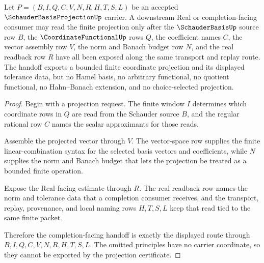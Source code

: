 \begin{theorem}
\label{thm:schauder-basis-projection-real-completion-handoff}
Let $P=(B,I,Q,C,V,N,R,H,T,S,L)$ be an accepted $\SchauderBasisProjectionUp$ carrier. A downstream Real or completion-facing consumer may read the finite projection only after the $\SchauderBasisUp$ source row $B$, the $\CoordinateFunctionalUp$ rows $Q$, the coefficient names $C$, the vector assembly row $V$, the norm and Banach budget row $N$, and the real readback row $R$ have all been exposed along the same transport and replay route. The handoff exports a bounded finite coordinate projection and its displayed tolerance data, but no Hamel basis, no arbitrary functional, no quotient functional, no Hahn--Banach extension, and no choice-selected projection.
\end{theorem}
\begin{proof}
Begin with a projection request. The finite window $I$ determines which coordinate rows in $Q$ are read from the Schauder source $B$, and the regular rational row $C$ names the scalar approximants for those reads.

Assemble the projected vector through $V$. The vector-space row supplies the finite linear-combination syntax for the selected basis vectors and coefficients, while $N$ supplies the norm and Banach budget that lets the projection be treated as a bounded finite operation.

Expose the Real-facing estimate through $R$. The real readback row names the norm and tolerance data that a completion consumer receives, and the transport, replay, provenance, and local naming rows $H,T,S,L$ keep that read tied to the same finite packet.

Therefore the completion-facing handoff is exactly the displayed route through $B,I,Q,C,V,N,R,H,T,S,L$. The omitted principles have no carrier coordinate, so they cannot be exported by the projection certificate.
\end{proof}



